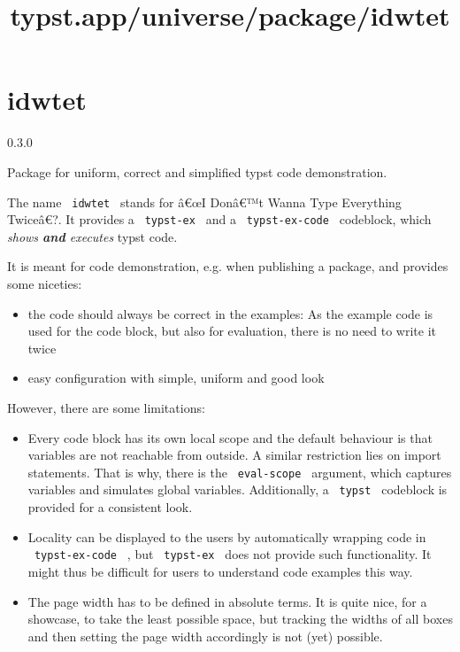 \title{typst.app/universe/package/idwtet}

\label{banner}
\section{idwtet}\label{idwtet}

{ 0.3.0 }

Package for uniform, correct and simplified typst code demonstration.

\label{readme}
The name \texttt{\ idwtet\ } stands for â€œI Donâ€™t Wanna Type
Everything Twiceâ€?. It provides a \texttt{\ typst-ex\ } and a
\texttt{\ typst-ex-code\ } codeblock, which \emph{shows \textbf{and}
executes} typst code.

It is meant for code demonstration, e.g. when publishing a package, and
provides some niceties:

\begin{itemize}
\tightlist
\item
  the code should always be correct in the examples: As the example code
  is used for the code block, but also for evaluation, there is no need
  to write it twice
\item
  easy configuration with simple, uniform and good look
\end{itemize}

However, there are some limitations:

\begin{itemize}
\tightlist
\item
  Every code block has its own local scope and the default behaviour is
  that variables are not reachable from outside. A similar restriction
  lies on import statements. That is why, there is the
  \texttt{\ eval-scope\ } argument, which captures variables and
  simulates global variables. Additionally, a \texttt{\ typst\ }
  codeblock is provided for a consistent look.
\item
  Locality can be displayed to the users by automatically wrapping code
  in \texttt{\ typst-ex-code\ } , but \texttt{\ typst-ex\ } does not
  provide such functionality. It might thus be difficult for users to
  understand code examples this way.
\item
  The page width has to be defined in absolute terms. It is quite nice,
  for a showcase, to take the least possible space, but tracking the
  widths of all boxes and then setting the page width accordingly is not
  (yet) possible.
\end{itemize}

